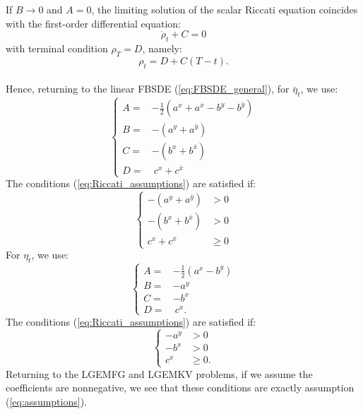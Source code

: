 \documentclass[11pt]{article}
\begin{document}
\begin{appendices}
	If $B \to 0$ and $A = 0$, the limiting solution of the scalar Riccati equation coincides with the first-order differential equation:
	\begin{equation*}
	    \dot{\rho}_t +C = 0
	\end{equation*}
	with terminal condition $\rho_T = D$, namely:
	\begin{equation*}
	    \rho_t = D + C(T-t).
	\end{equation*}\\
Hence, returning to the linear FBSDE (\ref{eq:FBSDE_general}), for $\bar{\eta}_t$, we use:
\begin{equation*}
	\left\{
	\begin{array}{rl}
		A=&-\frac{1}{2}(a^x+a^{\bar{x}}-b^y-b^{\bar{y}}) \\
		B=&-(a^y+a^{\bar{y}}) \\
		C=&-(b^x+b^{\bar{x}}) \\
		D=&\ c^x+c^{\bar{x}}
	\end{array}
	\right.
\end{equation*}
The conditions (\ref{eq:Riccati_assumptions}) are satisfied if:
\begin{equation*}
	\left\{
	\begin{array}{rl}
		-(a^y+a^{\bar{y}})&>0 \\
		-(b^x+b^{\bar{x}})&>0 \\
		c^x+c^{\bar{x}}& \geq 0
	\end{array}
	\right.
\end{equation*}
For $\eta_t$, we use:
\begin{equation*}
	\left\{
	\begin{array}{rl}
		A=&-\frac{1}{2}(a^x-b^y) \\
		B=&-a^y \\
		C=&-b^x \\
		D=&\ c^x.
	\end{array}
	\right.
\end{equation*}
The conditions (\ref{eq:Riccati_assumptions}) are satisfied if:
\begin{equation*}
	\left\{
	\begin{array}{rl}
		-a^y&>0 \\
		-b^x&>0 \\
		c^x& \geq0.
	\end{array}
	\right.
\end{equation*}
Returning to the LGEMFG and LGEMKV problems, if we assume the coefficients are nonnegative, we see that these conditions are exactly assumption (\ref{eq:assumptions}).

\end{appendices}
\end{document}
